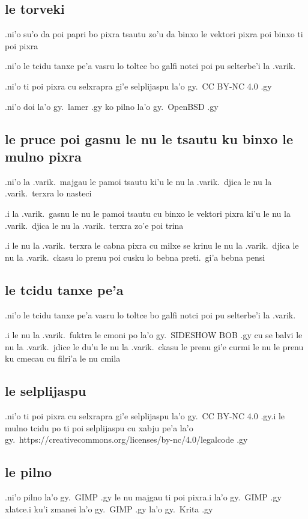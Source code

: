 \documentclass{report}
\begin{document}
\subsection{le torveki}
.ni'o su'o da poi papri bo pixra tsautu zo'u da binxo le vektori pixra poi binxo ti poi pixra

.ni'o le tcidu tanxe pe'a vasru lo toltce bo galfi notci poi pu selterbe'i la .varik.

.ni'o ti poi pixra cu selxrapra gi'e selplijaspu la'o gy.\ CC BY-NC 4.0 .gy

.ni'o doi la'o gy.\ lamer .gy ko pilno la'o gy.\ OpenBSD .gy

\subsection{le pruce poi gasnu le nu le tsautu ku binxo le mulno pixra}
.ni'o la .varik.\ majgau le pamoi tsautu ki'u le nu la .varik.\ djica le nu la .varik.\ terxra lo nasteci

.i la .varik.\ gasnu le nu le pamoi tsautu cu binxo le vektori pixra ki'u le nu la .varik.\ djica le nu la .varik.\ terxra zo'e poi trina

.i le nu la .varik.\ terxra le cabna pixra cu milxe se krinu le nu la .varik.\ djica le nu la .varik.\ ckasu lo prenu poi cusku lo bebna preti.\ gi'a bebna pensi

\subsection{le tcidu tanxe pe'a}
.ni'o le tcidu tanxe pe'a vasru lo toltce bo galfi notci poi pu selterbe'i la .varik.

.i le nu la .varik.\ fuktra le cmoni po la'o gy.\ SIDESHOW BOB .gy cu se balvi le nu la .varik.\ jdice le du'u le nu la .varik.\ ckasu le prenu gi'e curmi le nu le prenu ku cmecau cu filri'a le nu cmila

\subsection{le selplijaspu}
.ni'o ti poi pixra cu selxrapra gi'e selplijaspu la'o gy.\ CC BY-NC 4.0 .gy\@ .i le mulno tcidu po ti poi selplijaspu cu xabju pe'a la'o gy.\ https://creativecommons.org/licenses/by-nc/4.0/legalcode .gy

\subsection{le pilno}
.ni'o pilno la'o gy.\ GIMP .gy le nu majgau ti poi pixra\@ .i  la'o gy.\ GIMP .gy xlatce\@ .i ku'i zmanei la'o gy.\ GIMP .gy la'o gy.\ Krita .gy
\end{document}
